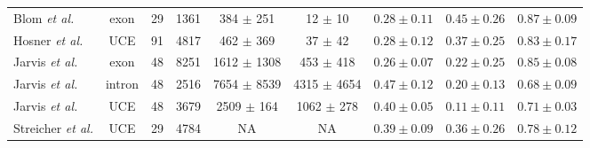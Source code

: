 \begin{landscape}
\begin{table}[!h]
\begin{tabular}{l cccc cc cc}
\midrule
Blom {\em et al.} \cite{blom2017accounting} & exon & 29 & 1361 & 384 $\pm$ 251 & 12 $\pm$ 10 & $0.28 \pm 0.11$ & $0.45 \pm 0.26$ & $0.87 \pm 0.09$ \\[0.5ex]
Hosner {\em et al.} \cite{hosner2016empirical} & \gls{UCE} & 91 & 4817 & 462 $\pm$ 369 & 37 $\pm$ 42 & $0.28 \pm 0.12$ &  $0.37 \pm 0.25$ & $0.83 \pm 0.17$ \\[0.5ex]
Jarvis {\em et al.} \cite{jarvis2014whole} & exon & 48 & 8251 & 1612 $\pm$ 1308 & 453 $\pm$ 418&  $0.26 \pm 0.07$ & $0.22 \pm 0.25$ & $0.85 \pm 0.08$ \\[0.5ex]
Jarvis {\em et al.} \cite{jarvis2014whole} & \gls{intron} & 48 & 2516 & 7654 $\pm$ 8539 & 4315 $\pm$ 4654 & $0.47 \pm 0.12$ & $0.20 \pm 0.13$ & $0.68 \pm 0.09$ \\[0.5ex]
Jarvis {\em et al.} \cite{jarvis2014whole} & UCE & 48 & 3679 & 2509 $\pm$ 164 & 1062 $\pm$ 278 & $0.40 \pm 0.05$ & $0.11 \pm 0.11$ & $0.71 \pm 0.03$ \\[0.5ex]
Streicher {\em et al.} \cite{streicher2016how} & UCE & 29 & 4784 & NA & NA & $0.39 \pm 0.09$ & $0.36 \pm 0.26$ & $0.78 \pm 0.12$ \\[0.5ex]
\bottomrule
\end{tabular}
\end{table}
\fillandplacepagenumber
\end{landscape}

